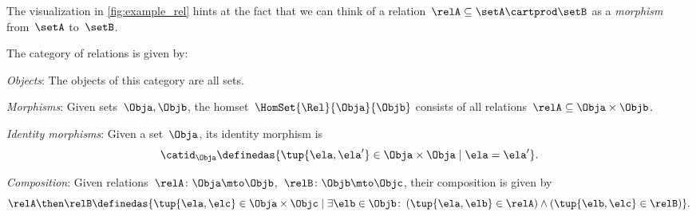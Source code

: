 The visualization in \cref{fig:example_rel} hints at the fact that we can think of a relation~$\relA \subseteq \setA \cartprod \setB$ as a \emph{morphism} from~$\setA$ to~$\setB$.


\begin{ctdefinition}
    \label{def:Rel}
    The category of relations \iindex{\Rel}  is given by:
    \begin{compactenum}
        \item \emph{Objects}: The objects of this category are all sets.
        \item \emph{Morphisms}: Given sets~$\Obja, \Objb$, the homset~$\HomSet{\Rel}{\Obja}{\Objb}$ consists of all
        relations~$\relA\subseteq \Obja\times \Objb$.
        \item \emph{Identity morphisms}: Given a set~$\Obja$, its identity morphism is
        \begin{equation}
            \catid_\Obja \definedas \{ \tup{\ela,\ela'} \in \Obja \times \Obja \mid  \ela = \ela' \}.
        \end{equation}
        \item \emph{Composition}: Given relations~$\relA \colon \Obja\mto \Objb$,~$\relB \colon \Objb\mto \Objc$, their composition is given by
        \begin{equation}
            \label{eq:RelCompRule}
            \relA \then \relB \definedas \{\tup{\ela,\elc} \in \Obja \times \Objc \mid  \exists \elb \in \Objb \colon \left(\tup{\ela,\elb} \in \relA\right) \wedge \left(\tup{\elb,\elc} \in \relB\right)\}.
        \end{equation}
    \end{compactenum}
\end{ctdefinition}

